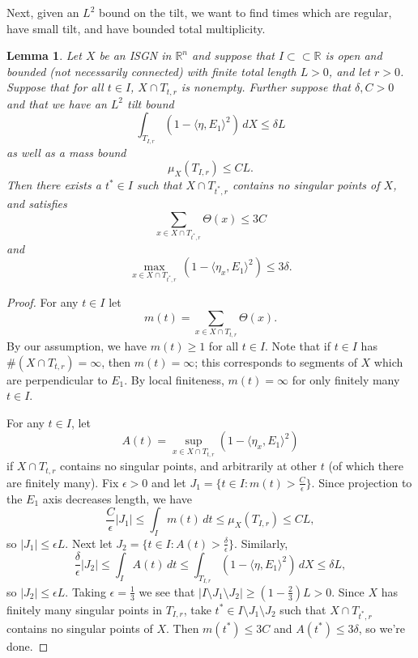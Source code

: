 \documentclass[10pt,a4paper]{amsart}
\newtheorem{lemma}{Lemma}
\begin{document}
Next, given an $L^2$ bound on the tilt, we want to find times which are regular, have small tilt, and have bounded total multiplicity. 

\begin{lemma} \label{find-point}
    Let $X$ be an ISGN in $\mathbb{R}^n$ and suppose that $I \subset\subset \mathbb{R}$ is open and bounded (not necessarily connected) with finite total length $L > 0$, and let $r > 0$. Suppose that for all $t \in I$, $X \cap T_{t,r}$ is nonempty. Further suppose that $\delta,C > 0$ and that we have an $L^2$ tilt bound
    \[\int_{T_{I,r}} (1 - \langle \eta,E_1\rangle^2) \, dX \leq \delta L\]
    as well as a mass bound
    \[\mu_X(T_{I,r}) \leq CL.\]
    Then there exists a $t^* \in I$ such that $X \cap T_{t^*,r}$ contains no singular points of $X$, and satisfies
    \[\sum_{x \in X \cap T_{t^*,r}} \Theta(x) \leq 3C\]
    and
    \[\max_{x \in X \cap T_{t^*,r}} \, (1 - \langle \eta_x, E_1\rangle^2) \leq 3\delta.\]
\end{lemma}

\begin{proof}
    For any $t \in I$ let
    \[m(t) = \sum_{x \in X \cap T_{t,r}} \Theta(x).\]
    By our assumption, we have $m(t) \geq 1$ for all $t \in I$. Note that if $t \in I$ has $ \#(X \cap T_{t,r}) = \infty$, then $m(t) = \infty$; this corresponds to segments of $X$ which are perpendicular to $E_1$. By local finiteness, $m(t) = \infty$ for only finitely many $t \in I$.
    
    For any $t \in I$, let
    \[A(t) = \sup_{x \in X \cap T_{t,r}} (1 - \langle \eta_x,E_1\rangle^2)\]
    if $X \cap T_{t,r}$ contains no singular points, and arbitrarily at other $t$ (of which there are finitely many).
    Fix $\epsilon > 0$ and let $J_1 = \{t \in I: m(t) > \frac{C}{\epsilon}\}.$ Since projection to the $E_1$ axis decreases length, we have
    \[\frac{C}{\epsilon}|J_1| \leq \int_{I} m(t) \, dt \leq \mu_X(T_{I,r}) \leq CL,\]
    so $|J_1| \leq \epsilon L$. Next let $J_2 = \{t \in I: A(t) > \frac{\delta}{\epsilon}\}.$ Similarly,
    \[\frac{\delta}{\epsilon}|J_2| \leq \int_{I} A(t) \, dt \leq \int_{T_{I,r}} (1 - \langle \eta,E_1\rangle^2) \, dX \leq \delta L,\]
    so $|J_2| \leq \epsilon L$. Taking $\epsilon = \frac{1}{3}$ we see that $|I \setminus J_1 \setminus J_2| \geq (1-\frac{2}{3})L > 0$. Since $X$ has finitely many singular points in $T_{I,r}$, take $t^* \in I \setminus J_1 \setminus J_2$ such that $X \cap T_{t^*,r}$ contains no singular points of $X$. Then $m(t^*) \leq 3C $ and $A(t^*) \leq 3\delta$, so we're done.
\end{proof}
\end{document}
